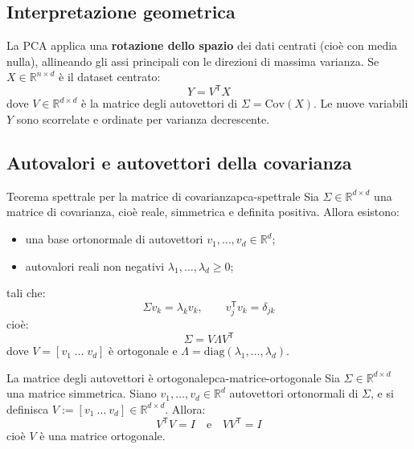 \subsection{Interpretazione geometrica}

La PCA applica una \textbf{rotazione dello spazio} dei dati centrati (cioè con media nulla), allineando gli assi principali con le direzioni di massima varianza. Se \( X \in \mathbb{R}^{n \times d} \) è il dataset centrato:
\[
Y = V^\mathsf{T} X
\]
dove \( V \in \mathbb{R}^{d \times d} \) è la matrice degli autovettori di \( \Sigma = \mathrm{Cov}(X) \). Le nuove variabili \( Y \) sono scorrelate e ordinate per varianza decrescente.

\subsection{Autovalori e autovettori della covarianza}

\begin{teorema}{Teorema spettrale per la matrice di covarianza}{pca-spettrale}
Sia \( \Sigma \in \mathbb{R}^{d \times d} \) una matrice di covarianza, cioè reale, simmetrica e definita positiva. Allora esistono:
\begin{itemize}
  \item una base ortonormale di autovettori \( v_1, \dots, v_d \in \mathbb{R}^d \);
  \item autovalori reali non negativi \( \lambda_1, \dots, \lambda_d \geq 0 \);
\end{itemize}
tali che:
\[
\Sigma v_k = \lambda_k v_k, \qquad v_j^\mathsf{T} v_k = \delta_{jk}
\]
cioè:
\[
\Sigma = V \Lambda V^\mathsf{T}
\]
dove \( V = [v_1 \; \dots \; v_d] \) è ortogonale e \( \Lambda = \mathrm{diag}(\lambda_1, \dots, \lambda_d) \).
\end{teorema}

\begin{proposizione}{La matrice degli autovettori è ortogonale}{pca-matrice-ortogonale}
Sia \( \Sigma \in \mathbb{R}^{d \times d} \) una matrice simmetrica. Siano \( v_1, \dots, v_d \in \mathbb{R}^d \) autovettori ortonormali di \( \Sigma \), e si definisca \( V := [v_1 \ \dots \ v_d] \in \mathbb{R}^{d \times d} \). Allora:
\[
V^\mathsf{T} V = I \quad \text{e} \quad VV^\mathsf{T} = I
\]
cioè \( V \) è una matrice ortogonale.
\end{proposizione}

